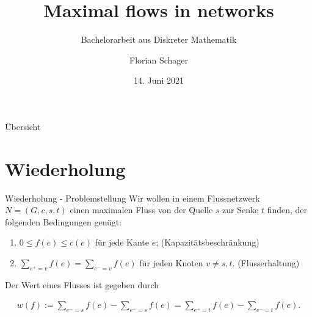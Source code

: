 \documentclass[aspectratio=169]{beamer}
\title[Maximum Flow Problem]{Maximal flows in networks}
\subtitle{Bachelorarbeit aus Diskreter Mathematik}
\author[F. Schager]{Florian Schager}
\institute[TU Wien]{TU Wien, Vienna, Austria}
\date{14. Juni 2021}
\begin{document}
\begin{frame}
    \titlepage
\end{frame}

\begin{frame}{Übersicht}
  \tableofcontents
\end{frame}


\section{Wiederholung}

\begin{frame}{Wiederholung - Problemstellung}
  Wir wollen in einem Flussnetzwerk $N = (G,c,s,t)$ einen maximalen Fluss 
  von der Quelle $s$ zur Senke $t$ finden, der folgenden Bedingungen genügt:

  \begin{enumerate}
    \item $0 \leq f(e) \leq c(e)$ für jede Kante $e$; \quad (Kapazitätsbeschränkung)
    \item $\sum_{e^+ = v} f(e) = \sum_{e^- = v} f(e)$ für jeden Knoten $v \neq s,t$.
    \quad (Flusserhaltung)
  \end{enumerate}



  Der Wert eines Flusses ist gegeben durch

  \begin{align*}
    w(f) := \sum_{e^- = s}f(e) - \sum_{e^+ = s} f(e) = \sum_{e^+ = t}f(e) - \sum_{e^- = t} f(e).
  \end{align*}

\end{frame}
\end{document}
